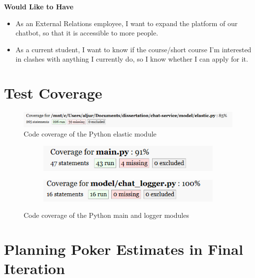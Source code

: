 \documentclass{l3proj}
\begin{document}
\textbf{Would Like to Have}
\begin{itemize}
\item As an External Relations employee, I want to expand the platform of our chatbot, so that it is accessible to more people.
\item As a current student, I want to know if the course/short course I’m interested in clashes with anything I currently do, so I know whether I can apply for it.
\end{itemize}
\fi

\smallskip
\section{Test Coverage}
\label{apdx:coverage}

\begin{figure}[h]
    \centering
    \includegraphics[width=0.85\linewidth]{figures/Unit_Testing_1.PNG}
    \caption{Code coverage of the Python elastic module}
\end{figure}

\begin{figure}[h]
  \centering
  \begin{subfigure}[b]{0.425\linewidth}
    \includegraphics[width=\linewidth]{figures/Unit_Testing_2.PNG}
  \end{subfigure}
  \begin{subfigure}[b]{0.425\linewidth}
    \includegraphics[width=\linewidth]{figures/Unit_Testing_3.PNG}
  \end{subfigure}
  \caption{Code coverage of the Python main and logger modules}
\end{figure}

\section{Planning Poker Estimates in Final Iteration}
\label{apdx:pp}
\end{document}
